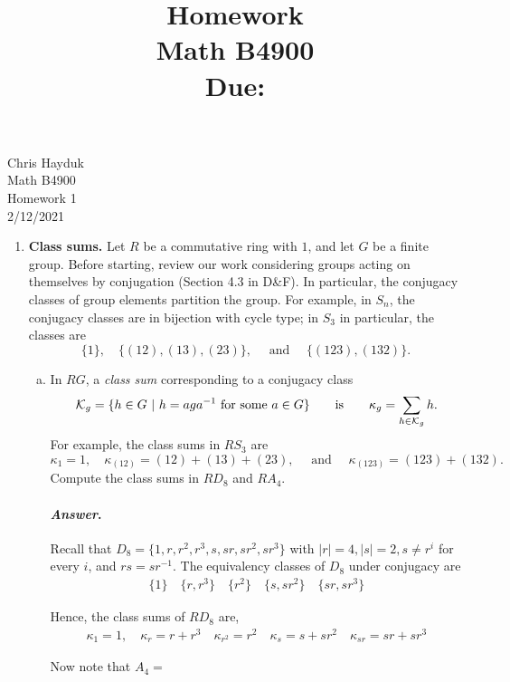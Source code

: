 \documentclass[11pt, reqno]{amsart}
\title[Homework \HW]{Homework \HW \\
Math B4900\\
\small Due: \DUE}
\author{}
\theoremstyle{plain}
\theoremstyle{definition}
\theoremstyle{example}
\newenvironment{ans}{\medskip \paragraph*{\emph{Answer}.}}{\hfill \break  $~\!\!$ \dotfill \medskip }
\def\HW{1}
\def\DUE{2/12/2021}
\begin{document}
\begin{flushright}
Chris Hayduk\\
Math B4900\\
Homework \HW\\
\DUE
\end{flushright}


\begin{enumerate}[1.]
\item \textbf{Class sums.}
Let $R$ be a commutative ring with $1$, and let $G$ be a finite group. Before starting, review our work considering groups acting on themselves by conjugation (Section 4.3 in D\&F). In particular, the conjugacy classes of group elements partition the group. For example, in $S_n$, the conjugacy classes are in bijection with cycle type; in $S_3$ in particular, the classes are 
$$\{1\}, \quad \{(12), (13), (23)\}, \quad \text{ and } \quad \{(123), (132)\}.$$
\begin{enumerate}[(a)]
\item In $RG$, a \emph{class sum} corresponding to a conjugacy class 
$$\mathcal{K}_g = \{h \in G ~|~ h = aga^{-1} \text{ for some }a \in G\} \qquad  \text{is}  \qquad 
	\kappa_g = \sum_{h \in \mathcal{K}_g} h.$$
 For example, the class sums in $RS_3$ are 
$$\kappa_1 = 1, \quad \kappa_{(12)} = (12) + (13) +  (23), \quad  \text{ and } \quad 
	\kappa_{(123)} = (123) + (132).$$
Compute the class sums in $RD_8$ and $RA_4$. 

\begin{ans}
Recall that $D_8 = \{1, r, r^2, r^3, s, sr, sr^2, sr^3\}$ with $|r| = 4, |s| = 2, s \neq r^i$ for every $i$, and $rs = sr^{-1}$. The equivalency classes of $D_8$ under conjugacy are 
\begin{align*}
\{1\} \quad \{r, r^3\} \quad \{r^2\} \quad \{s, sr^2\} \quad \{sr, sr^3\}
\end{align*}

Hence, the class sums of $RD_8$ are,
\begin{align*}
\kappa_1 = 1, \quad \kappa_r = r + r^3 \quad \kappa_{r^2} = r^2 \quad \kappa_s = s + sr^2 \quad \kappa_{sr} = sr + sr^3
\end{align*}

Now note that $A_4 = $
\end{ans}


\end{enumerate}
\end{enumerate}
\end{document}
